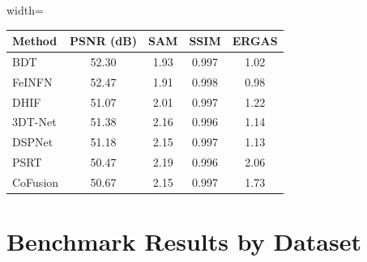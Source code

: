 \documentclass[conference]{IEEEtran}
\begin{document}
\begin{table}[htbp]
\label{tab:baseline}
\begin{center}
\begin{adjustbox}{width=\columnwidth}
\begin{tabular}{lcccc}
\toprule
\textbf{Method} & \textbf{PSNR (dB)} & \textbf{SAM} & \textbf{SSIM} & \textbf{ERGAS} \\
\midrule
BDT & 52.30 & 1.93 & 0.997 & 1.02 \\
FeINFN & 52.47 & 1.91 & 0.998 & 0.98 \\
DHIF & 51.07 & 2.01 & 0.997 & 1.22 \\
3DT-Net & 51.38 & 2.16 & 0.996 & 1.14 \\
DSPNet & 51.18 & 2.15 & 0.997 & 1.13 \\
PSRT & 50.47 & 2.19 & 0.996 & 2.06 \\
CoFusion & 50.67 & 2.15 & 0.997 & 1.73 \\
\bottomrule
\end{tabular}
\end{adjustbox}
\end{center}
\end{table}

\section{Benchmark Results by Dataset}
\end{document}
